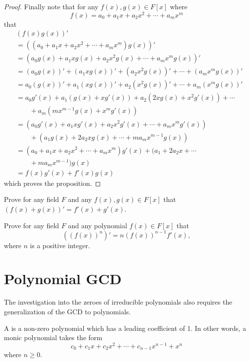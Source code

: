 \begin{proof}
    Finally note that for any $f(x), g(x) \in F[x]$ where
    \[
        f(x) = a_0 + a_1x + a_2x^2 + \cdots + a_mx^m
    \]
    that
    \begin{align*}
        &(f(x)g(x))'\\
        &= \left((a_0 + a_1x + a_2x^2 + \cdots + a_mx^m)g(x)\right)'\\
        &= \left(a_0g(x) + a_1xg(x) + a_2x^2g(x) + \cdots + a_mx^mg(x)\right)'\\
        &= (a_0g(x))' + (a_1xg(x))' + (a_2x^2g(x))' + \cdots + (a_mx^mg(x))'\\
        &= a_0(g(x))' + a_1(xg(x))' + a_2(x^2g(x))' + \cdots + a_m(x^mg(x))'\\
        &= a_0g'(x) + a_1(g(x) + xg'(x)) + a_2(2xg(x) + x^2g'(x)) + \cdots\\
        &\quad\quad+ a_m(mx^{m-1}g(x) + x^mg'(x))\\
        &= (a_0g'(x) + a_1xg'(x) + a_2x^2g'(x) + \cdots + a_mx^mg'(x))\\
        &\quad\quad+ (a_1g(x) + 2a_2xg(x) + \cdots + ma_mx^{m-1}g(x))\\
        &= (a_0 + a_1x + a_2x^2 + \cdots + a_mx^m)g'(x) + (a_1 + 2a_2x + \cdots\\
        &\quad\quad+ ma_mx^{m-1})g(x)\\
        &= f(x)g'(x) + f'(x)g(x)
    \end{align*}
    which proves the proposition.
\end{proof}

\begin{exercise}\label{exercise-derivative-sum-rule}
    Prove for any field $F$ and any $f(x), g(x) \in F[x]$ that $(f(x)+g(x))' = f'(x) + g'(x)$.
\end{exercise}

\begin{exercise}
    Prove for any field $F$ and any polynomial $f(x) \in F[x]$ that
    \[
        \left((f(x))^n\right)' = n(f(x))^{n-1}f'(x),
    \]
    where $n$ is a positive integer.
\end{exercise}

\section{Polynomial GCD}
The investigation into the zeroes of irreducible polynomials also requires the generalization of the GCD to polynomials.

\begin{definition}
    A  is a non-zero polynomial which has a leading coefficient of 1. In other words, a monic polynomial takes the form
    \[
        c_0 + c_1x + c_2x^2 + \cdots + c_{n-1}x^{n-1} + x^n
    \]
    where $n \geq 0$.
\end{definition}

